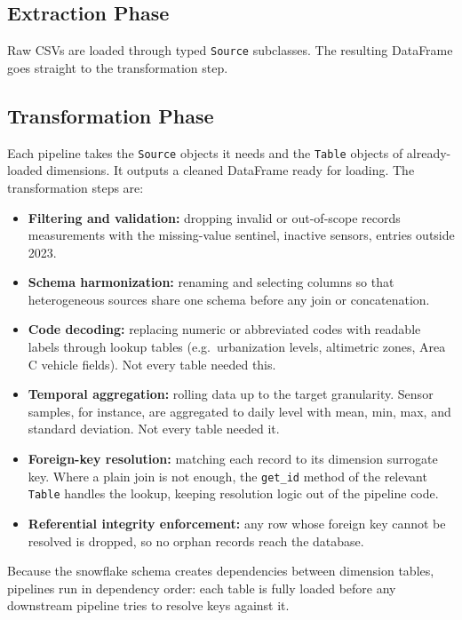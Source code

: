 \documentclass{article}
\begin{document}
	\subsection{Extraction Phase}

	Raw CSVs are loaded through typed \texttt{Source} subclasses. The resulting DataFrame goes straight to the transformation step.

	\subsection{Transformation Phase}

	Each pipeline takes the \texttt{Source} objects it needs and the \texttt{Table} objects of already-loaded dimensions. It outputs a cleaned DataFrame ready for loading. The transformation steps are:

	\begin{itemize}
		\item \textbf{Filtering and validation:} dropping invalid or out-of-scope records measurements with the missing-value sentinel, inactive sensors, entries outside 2023.
		\item \textbf{Schema harmonization:} renaming and selecting columns so that heterogeneous sources share one schema before any join or concatenation.
		\item \textbf{Code decoding:} replacing numeric or abbreviated codes with readable labels through lookup tables (e.g.\ urbanization levels, altimetric zones, Area C vehicle fields). Not every table needed this.
		\item \textbf{Temporal aggregation:} rolling data up to the target granularity. Sensor samples, for instance, are aggregated to daily level with mean, min, max, and standard deviation. Not every table needed it.
		\item \textbf{Foreign-key resolution:} matching each record to its dimension surrogate key. Where a plain join is not enough, the \texttt{get\_id} method of the relevant \texttt{Table} handles the lookup, keeping resolution logic out of the pipeline code.
		\item \textbf{Referential integrity enforcement:} any row whose foreign key cannot be resolved is dropped, so no orphan records reach the database.
	\end{itemize}

	Because the snowflake schema creates dependencies between dimension tables, pipelines run in dependency order: each table is fully loaded before any downstream pipeline tries to resolve keys against it.
\end{document}
